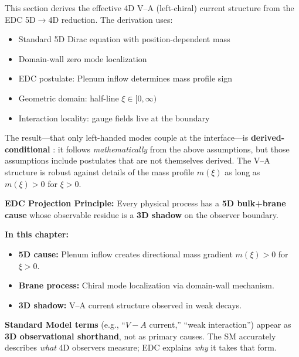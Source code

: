 
\label{sec:ch9_va_structure}

\begin{tcolorbox}[edcGuardrail, title=\textbf{Epistemic Status}]
This section derives the effective 4D V–A (left-chiral) current structure
from the EDC 5D$\to$4D reduction. The derivation uses:
\begin{itemize}[nosep]
    \item Standard 5D Dirac equation with position-dependent mass \tagBL{}
    \item Domain-wall zero mode localization~\cite{JackiwRebbi1976,Kaplan1992} \tagBL{}
    \item EDC postulate: Plenum inflow determines mass profile sign \tagP{}
    \item Geometric domain: half-line $\xi \in [0, \infty)$ \tagP{}
    \item Interaction locality: gauge fields live at the boundary \tagP{}
\end{itemize}
The result---that only left-handed modes couple at the interface---is
\textbf{derived-conditional} \tagDc{}: it follows \emph{mathematically} from
the above assumptions, but those assumptions include postulates \tagP{} that
are not themselves derived. The V--A structure is robust against details of
the mass profile $m(\xi)$ as long as $m(\xi) > 0$ for $\xi > 0$.
\end{tcolorbox}

\begin{tcolorbox}[colback=blue!3!white, colframe=blue!50!black,
    title=\textbf{Framework 2.0 Language Compliance}]
\small
\textbf{EDC Projection Principle:} Every physical process has a \textbf{5D bulk+brane cause}
whose observable residue is a \textbf{3D shadow} on the observer boundary.

\textbf{In this chapter:}
\begin{itemize}[nosep]
    \item \textbf{5D cause:} Plenum inflow creates directional mass gradient $m(\xi) > 0$ for $\xi > 0$.
    \item \textbf{Brane process:} Chiral mode localization via domain-wall mechanism.
    \item \textbf{3D shadow:} V--A current structure observed in weak decays.
\end{itemize}

\textbf{Standard Model terms} (e.g., ``$V{-}A$ current,'' ``weak interaction'') appear as
\textbf{3D observational shorthand}, not as primary causes. The SM accurately describes
\emph{what} 4D observers measure; EDC explains \emph{why} it takes that form.
\end{tcolorbox}


